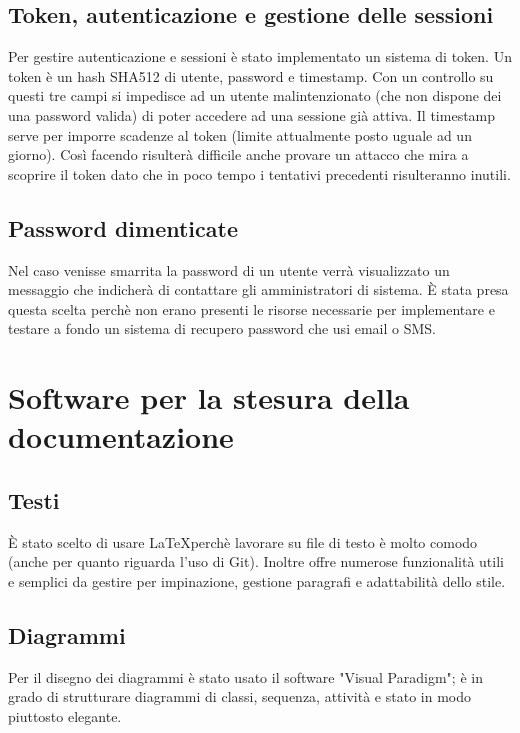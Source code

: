 \documentclass[12pt]{scrartcl}
\begin{document}
\subsection{Token, autenticazione e gestione delle sessioni}
    Per gestire autenticazione e sessioni \`e stato implementato un sistema di
    token. Un token \`e un hash SHA512 di utente, password e timestamp. Con un controllo
    su questi tre campi si impedisce ad un utente malintenzionato (che non dispone dei una
    password valida) di poter accedere ad una sessione gi\`a attiva. 
    Il timestamp serve per imporre scadenze al token (limite attualmente posto
    uguale ad un giorno). Cos\`i facendo risulter\`a difficile anche provare un
    attacco che mira a scoprire il token dato che in poco tempo i tentativi precedenti
    risulteranno inutili.
\subsection{Password dimenticate}
    Nel caso venisse smarrita la password di un utente verr\`a visualizzato
    un messaggio che indicher\`a di contattare gli amministratori di 
    sistema. \`E stata presa questa scelta perch\`e non erano presenti
    le risorse necessarie per implementare e testare a fondo un sistema
    di recupero password che usi email o SMS.

\section{Software per la stesura della documentazione}
\subsection{Testi}
    \`E stato scelto di usare \LaTeX perch\`e lavorare su file di testo \`e molto
    comodo (anche per quanto riguarda l'uso di Git). Inoltre offre numerose
    funzionalit\`a utili e semplici da gestire per impinazione, gestione paragrafi
    e adattabilit\`a dello stile.
\subsection{Diagrammi}
    Per il disegno dei diagrammi \`e stato usato il software "Visual Paradigm";
    \`e in grado di strutturare diagrammi di classi, sequenza, attivit\`a e
    stato in modo piuttosto elegante.
\end{document}
